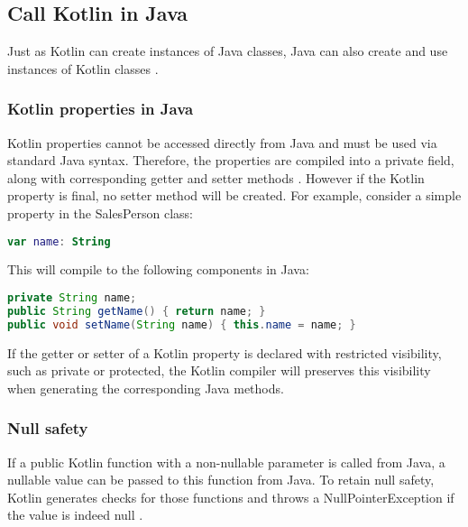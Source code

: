 \documentclass[a4paper,11pt]{article}
\begin{document}
\subsection{Call Kotlin in Java}
Just as Kotlin can create instances of Java classes, Java can also create and use instances of Kotlin classes \cite{interop-java}.

\subsubsection{Kotlin properties in Java}
Kotlin properties cannot be accessed directly from Java and must be used via standard Java syntax. Therefore, the properties are compiled into a private field, along with corresponding getter and setter methods \cite{interop-properties}. However if the Kotlin property is final, no setter method will be created. For example, consider a simple property in the SalesPerson class:
\begin{lstlisting}[language=Kotlin]
var name: String
\end{lstlisting}
This will compile to the following components in Java:
\begin{lstlisting}[language=Java]
private String name;
public String getName() { return name; }
public void setName(String name) { this.name = name; }
\end{lstlisting}
If the getter or setter of a Kotlin property is declared with restricted visibility, such as private or protected, the Kotlin compiler will preserves this visibility when generating the corresponding Java methods.

\subsubsection{Null safety} %
If a public Kotlin function with a non-nullable parameter is called from Java, a nullable value can be passed to this function from Java. To retain null safety, Kotlin generates checks for those functions and throws a NullPointerException if the value is indeed null \cite{interop-java-null-safety}.
\end{document}
